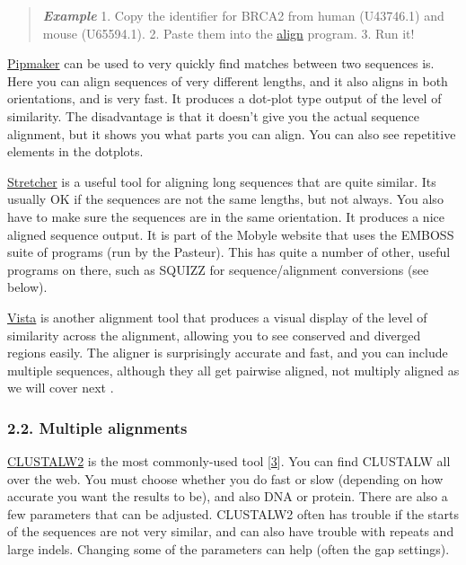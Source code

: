 \documentclass[]{article}
\begin{document}
\begin{quote}
\emph{\textbf{Example}} 1. Copy the identifier for BRCA2 from human
(U43746.1) and mouse (U65594.1). 2. Paste them into the
\href{http://blast.ncbi.nlm.nih.gov/Blast.cgi?PAGE_TYPE=BlastSearch\&BLAST_SPEC=blast2seq\&LINK_LOC=align2seq}{align}
program. 3. Run it!
\end{quote}

\href{http://pipmaker.bx.psu.edu/cgi-bin/pipmaker?advanced}{Pipmaker}
can be used to very quickly find matches between two sequences is. Here
you can align sequences of very different lengths, and it also aligns in
both orientations, and is very fast. It produces a dot-plot type output
of the level of similarity. The disadvantage is that it doesn't give you
the actual sequence alignment, but it shows you what parts you can
align. You can also see repetitive elements in the dotplots.

\href{http://mobyle.pasteur.fr/cgi-bin/MobylePortal/portal.py?form=stretcher}{Stretcher}
is a useful tool for aligning long sequences that are quite similar. Its
usually OK if the sequences are not the same lengths, but not always.
You also have to make sure the sequences are in the same orientation. It
produces a nice aligned sequence output. It is part of the Mobyle
website that uses the EMBOSS suite of programs (run by the Pasteur).
This has quite a number of other, useful programs on there, such as
SQUIZZ for sequence/alignment conversions (see below).

\href{http://genome.lbl.gov/vista/index.shtml}{Vista} is another
alignment tool that produces a visual display of the level of similarity
across the alignment, allowing you to see conserved and diverged regions
easily. The aligner is surprisingly accurate and fast, and you can
include multiple sequences, although they all get pairwise aligned, not
multiply aligned as we will cover next .

\subsubsection{2.2. Multiple alignments}\label{multiple-alignments}

\href{https://www.ebi.ac.uk/Tools/msa/clustalw2/}{CLUSTALW2} is the most
commonly-used tool
{[}\href{http://www.ncbi.nlm.nih.gov/pubmed/17846036}{3}{]}. You can
find CLUSTALW all over the web. You must choose whether you do fast or
slow (depending on how accurate you want the results to be), and also
DNA or protein. There are also a few parameters that can be adjusted.
CLUSTALW2 often has trouble if the starts of the sequences are not very
similar, and can also have trouble with repeats and large indels.
Changing some of the parameters can help (often the gap settings).
\end{document}
